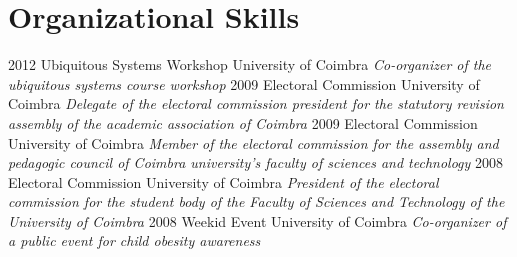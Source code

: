 \documentclass[]{friggeri-cv} %
\begin{document}

\section{Organizational Skills}

\begin{entrylist}
\entry
{2012}
{Ubiquitous Systems Workshop}
{University of Coimbra}
{\emph{Co-organizer of the ubiquitous systems course workshop}}
\entry
{2009}
{Electoral Commission}
{University of Coimbra}
{\emph{Delegate of the electoral commission president for the statutory revision assembly of the academic association of Coimbra}}
\entry
{2009}
{Electoral Commission}
{University of Coimbra}
{\emph{Member of the electoral commission for the assembly and pedagogic council of Coimbra university's faculty of sciences and technology}}
\entry
{2008}
{Electoral Commission}
{University of Coimbra}
{\emph{President of the electoral commission for the student body of the Faculty of Sciences and Technology of the University of Coimbra}}
\entry
{2008}
{Weekid Event}
{University of Coimbra}
{\emph{Co-organizer of a public event for child obesity awareness}}
\end{entrylist}
\end{document}
